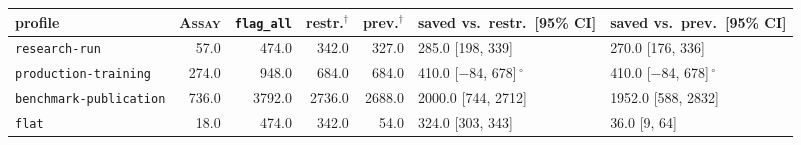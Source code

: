 \begin{tabular}{@{}lrrrrll@{}}
\toprule
profile & \textsc{Assay} & \texttt{flag\_all} & restr.$^\dagger$ & prev.$^\dagger$ & saved vs.\ restr.\ [95\% CI] & saved vs.\ prev.\ [95\% CI] \\
\midrule
\texttt{research-run} & 57.0 & 474.0 & 342.0 & 327.0 & 285.0 [198, 339] & 270.0 [176, 336] \\
\texttt{production-training} & 274.0 & 948.0 & 684.0 & 684.0 & 410.0 [$-$84, 678]\,$^\circ$ & 410.0 [$-$84, 678]\,$^\circ$ \\
\texttt{benchmark-publication} & 736.0 & 3792.0 & 2736.0 & 2688.0 & 2000.0 [744, 2712] & 1952.0 [588, 2832] \\
\texttt{flat} & 18.0 & 474.0 & 342.0 & 54.0 & 324.0 [303, 343] & 36.0 [9, 64] \\
\bottomrule
\end{tabular}
